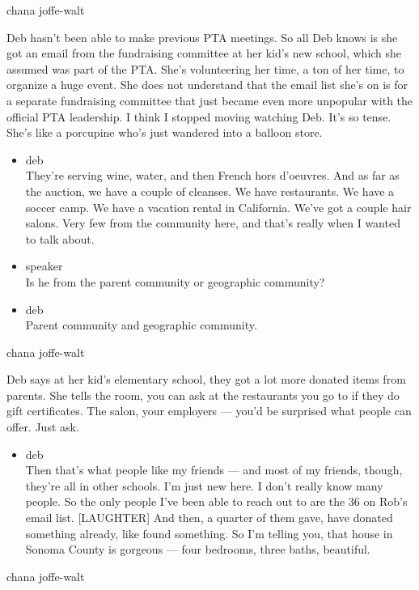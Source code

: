 chana joffe-walt

Deb hasn't been able to make previous PTA meetings. So all Deb knows is
she got an email from the fundraising committee at her kid's new school,
which she assumed was part of the PTA. She's volunteering her time, a
ton of her time, to organize a huge event. She does not understand that
the email list she's on is for a separate fundraising committee that
just became even more unpopular with the official PTA leadership. I
think I stopped moving watching Deb. It's so tense. She's like a
porcupine who's just wandered into a balloon store.

\begin{itemize}
\item
  deb\\
  They're serving wine, water, and then French hors d'oeuvres. And as
  far as the auction, we have a couple of cleanses. We have restaurants.
  We have a soccer camp. We have a vacation rental in California. We've
  got a couple hair salons. Very few from the community here, and that's
  really when I wanted to talk about.
\item
  speaker\\
  Is he from the parent community or geographic community?
\item
  deb\\
  Parent community and geographic community.
\end{itemize}

chana joffe-walt

Deb says at her kid's elementary school, they got a lot more donated
items from parents. She tells the room, you can ask at the restaurants
you go to if they do gift certificates. The salon, your employers ---
you'd be surprised what people can offer. Just ask.

\begin{itemize}
\tightlist
\item
  deb\\
  Then that's what people like my friends --- and most of my friends,
  though, they're all in other schools. I'm just new here. I don't
  really know many people. So the only people I've been able to reach
  out to are the 36 on Rob's email list. {[}LAUGHTER{]} And then, a
  quarter of them gave, have donated something already, like found
  something. So I'm telling you, that house in Sonoma County is gorgeous
  --- four bedrooms, three baths, beautiful.
\end{itemize}

chana joffe-walt

